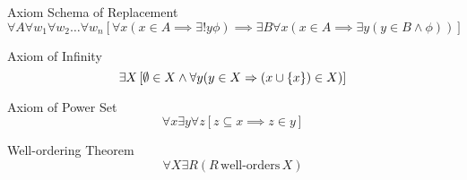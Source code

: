 \begin{axiomset}
    \begin{axiom}
        Axiom Schema of Replacement
        \begin{equation}
            \forall A \forall w_1 \forall w_2 \ldots \forall w_n \left[ \forall x ( x \in A \implies \exists! y \phi ) \implies \exists B \forall x (x \in A \implies \exists y (y \in B \land \phi)) \right]
        \end{equation}
    \end{axiom}
    \begin{axiom}
        Axiom of Infinity
        \begin{equation}
            \exists X \left[ \emptyset \in X \wedge \forall y (y \in X \Rightarrow (x \cup \{x\}) \in X)\right]
        \end{equation}
    \end{axiom}
    \begin{axiom}
        Axiom of Power Set
        \begin{equation}
            \forall x \exists y \forall z \left[ z \subseteq x \implies z \in y \right]
        \end{equation}
    \end{axiom}
    \begin{axiom}
        Well-ordering Theorem
        \begin{equation}
            \forall X \exists R (R\,\text{well-orders}\, X)
        \end{equation}
    \end{axiom}
\end{axiomset}

